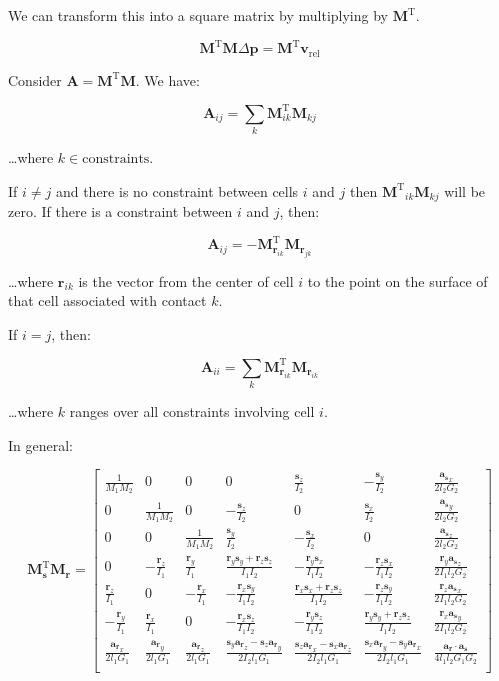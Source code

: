 \documentclass{report}
\renewcommand{\vec}[1]{\mathbf{#1}}
\newcommand{\deltap}{\Delta \vec{p}}
\begin{document}
We can transform this into a square matrix by multiplying by $\vec{M}^\textrm{T}$.

\[
\vec{M}^\textrm{T} \vec{M} \deltap = \vec{M}^\textrm{T} \vec{v}_{\textrm{rel}}
\]

Consider $\vec{A} = \vec{M}^\textrm{T} \vec{M}$.  We have:

\[
\vec{A}_{ij} = \sum_{k} \vec{M}^\textrm{T}_{ik} \vec{M}_{kj}
\]

\dots where $k \in \textrm{constraints}$.

If $i \neq j$ and there is no constraint between cells $i$ and $j$
then ${\vec{M}^\textrm{T}}_{ik} \vec{M}_{kj}$ will be zero.  If there
is a constraint between $i$ and $j$, then:

\[
\vec{A}_{ij} = -\vec{M}^\textrm{T}_{\vec{r}_{ik}} \vec{M}_{\vec{r}_{jk}}
\]

\dots where $\vec{r}_{ik}$ is the vector from the center of cell $i$
to the point on the surface of that cell associated with contact $k$.

If $i=j$, then:

\[
\vec{A}_{ii} = \sum_k{\vec{M}^\textrm{T}_{\vec{r}_{ik}}\vec{M}_{\vec{r}_{ik}}}
\]

\dots where $k$ ranges over all constraints involving cell $i$.

In general:

\[
\vec{M}_\vec{s}^\textrm{T} \vec{M}_\vec{r}
=
\begin{bmatrix*}
\frac{1}{M_1M_2} & 0 & 0 & 0 & \frac{\vec{s}_z}{I_2} & -\frac{\vec{s}_y}{I_2} & \frac{{\vec{a}_\vec{s}}_x}{2l_2G_2} \\[6pt]
0 & \frac{1}{M_1M_2} & 0 & -\frac{\vec{s}_z}{I_2} & 0 & \frac{\vec{s}_x}{I_2} & \frac{{\vec{a}_\vec{s}}_y}{2l_2G_2} \\[6pt]
0 & 0 & \frac{1}{M_1M_2} & \frac{\vec{s}_y}{I_2} & -\frac{\vec{s}_x}{I_2} & 0 & \frac{{\vec{a}_\vec{s}}_z}{2l_2G_2} \\[6pt]
0 & -\frac{\vec{r}_z}{I_1} & \frac{\vec{r}_y}{I_1} & \frac{\vec{r}_y\vec{s}_y + \vec{r}_z\vec{s}_z}{I_1I_2} & -\frac{\vec{r}_y\vec{s}_x}{I_1I_2} & -\frac{\vec{r}_z\vec{s}_x}{I_1I_2} & \frac{\vec{r}_y{\vec{a}_\vec{s}}_z}{2I_1l_2G_2} \\[6pt]
\frac{\vec{r}_z}{I_1} & 0 & -\frac{\vec{r}_x}{I_1} & -\frac{\vec{r}_x\vec{s}_y}{I_1I_2} & \frac{\vec{r}_x\vec{s}_x + \vec{r}_z\vec{s}_z}{I_1I_2} & -\frac{\vec{r}_z\vec{s}_y}{I_1I_2} & \frac{\vec{r}_z{\vec{a}_\vec{s}}_x}{2I_1l_2G_2} \\[6pt]
-\frac{\vec{r}_y}{I_1} & \frac{\vec{r}_x}{I_1} & 0 & -\frac{\vec{r}_x\vec{s}_z}{I_1I_2} & -\frac{\vec{r}_y\vec{s}_z}{I_1I_2} & \frac{\vec{r}_y\vec{s}_y + \vec{r}_z\vec{s}_z}{I_1I_2} & \frac{\vec{r}_x{\vec{a}_\vec{s}}_y}{2I_1l_2G_2} \\[6pt]
\frac{{\vec{a}_\vec{r}}_x}{2l_1G_1} & \frac{{\vec{a}_\vec{r}}_y}{2l_1G_1} & \frac{{\vec{a}_\vec{r}}_z}{2l_1G_1} &
\frac{\vec{s}_y{\vec{a}_\vec{r}}_z - \vec{s}_z{\vec{a}_\vec{r}}_y}{2I_2l_1G_1} &
\frac{\vec{s}_z{\vec{a}_\vec{r}}_x - \vec{s}_x{\vec{a}_\vec{r}}_z}{2I_2l_1G_1} &
\frac{\vec{s}_x{\vec{a}_\vec{r}}_y - \vec{s}_y{\vec{a}_\vec{r}}_x}{2I_2l_1G_1} &
\frac{\vec{a}_\vec{r} \cdot \vec{a}_\vec{s}}{4l_1l_2G_1G_2} \\
\end{bmatrix*}
\]
\end{document}
